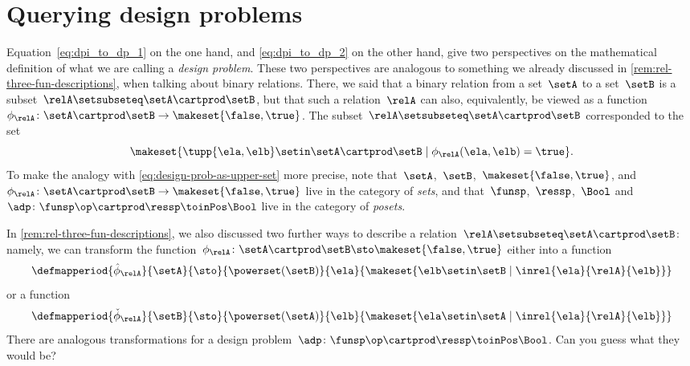 
\section{Querying design problems}
\label{sec:dp-querying}



Equation~\cref{eq:dpi_to_dp_1} on the one hand, and \cref{eq:dpi_to_dp_2} on the other hand, give two perspectives on the mathematical definition of what we are calling a \emph{design problem}.
These two perspectives are analogous to something we already discussed in \cref{rem:rel-three-fun-descriptions}, when talking about binary relations.
There, we said that a binary relation from a set~$\setA$ to a set~$\setB$ is a subset~$\relA \setsubseteq \setA \cartprod \setB$,
but that such a relation~$\relA$ can also, equivalently, be viewed as a function~$\phi_{\relA}\colon \setA \cartprod\setB \to \makeset{ \false, \true }$.
The subset~$\relA \setsubseteq \setA \cartprod \setB$ corresponded to the set
\begin{equation}
    \makeset{ \tupp{\ela, \elb} \setin \setA \cartprod \setB \mid \phi_{\relA}(\ela, \elb) = \true }.
\end{equation}
%
To make the analogy with \cref{eq:design-prob-as-upper-set} more precise, note that~$\setA$,~$\setB$,~$\makeset{ \false, \true }$, and~$\phi_{\relA}\colon \setA \cartprod\setB \to \makeset{ \false, \true }$ live in the category of \emph{sets}, and that~$\funsp$,~$\ressp$,~$\Bool$ and~$\adp\colon \funsp\op \cartprod \ressp\toinPos \Bool$ live in the category of \emph{posets}.

In \cref{rem:rel-three-fun-descriptions}, we also discussed two further ways to describe a relation~$\relA \setsubseteq \setA \cartprod \setB$: namely, we can transform the function~$\phi_{\relA}\colon \setA \cartprod\setB \sto \makeset{ \false, \true }$ either into a function
\begin{equation}
    \label{eq:curried-relation-again}
    \defmapperiod{\hat \phi_{\relA}}{\setA}{\sto}{\powerset(\setB)}{\ela}{\makeset{ \elb \setin \setB \mid \inrel{\ela}{\relA}{\elb} }}
\end{equation}
or a function
\begin{equation}
    \label{eq:co-curried-relation-again}
    \defmapperiod{\check \phi_{\relA}}{\setB}{\sto}{\powerset (\setA)}{\elb}{\makeset{ \ela \setin \setA \mid \inrel{\ela}{\relA}{\elb}}}
\end{equation}
%
There are analogous transformations for a design problem~$\adp\colon \funsp\op \cartprod \ressp\toinPos \Bool$.
Can you guess what they would be?

